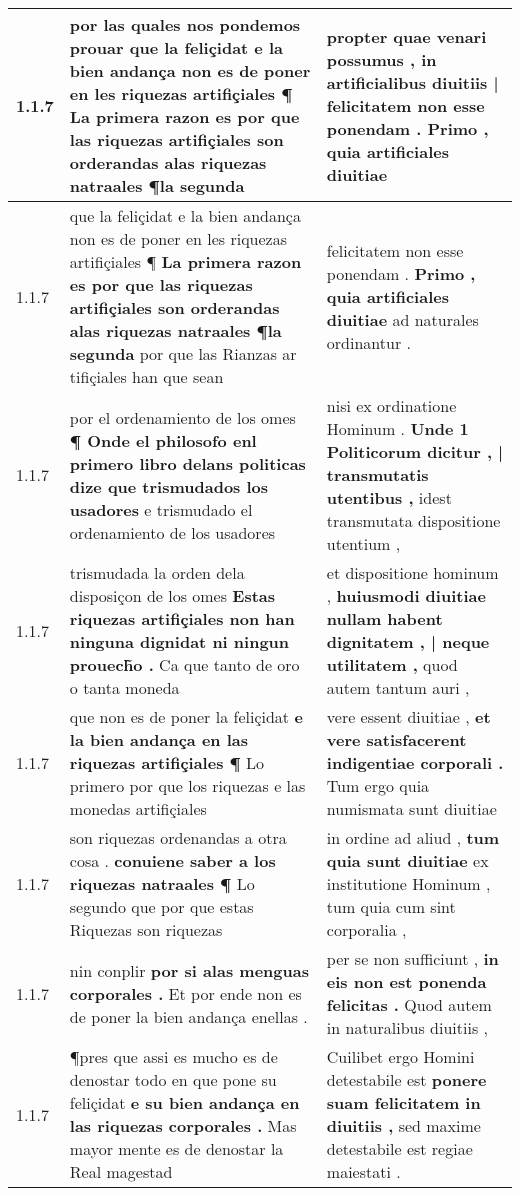 \begin{tabular}{|p{1cm}|p{6.5cm}|p{6.5cm}|}
1.1.7 & por las quales nos pondemos prouar \textbf{ que la feliçidat e la bien andança non es de poner en les riquezas artifiçiales ¶ } La primera razon es por que las riquezas artifiçiales son orderandas alas riquezas natraales ¶la segunda & propter quae venari possumus , \textbf{ in artificialibus diuitiis | felicitatem non esse ponendam . } Primo , quia artificiales diuitiae \\\hline
1.1.7 & que la feliçidat e la bien andança non es de poner en les riquezas artifiçiales ¶ \textbf{ La primera razon es por que las riquezas artifiçiales son orderandas alas riquezas natraales ¶la segunda } por que las Rianzas ar tifiçiales han que sean & felicitatem non esse ponendam . \textbf{ Primo , quia artificiales diuitiae } ad naturales ordinantur . \\\hline
1.1.7 & por el ordenamiento de los omes \textbf{ ¶ Onde el philosofo enl primero libro delans politicas dize que trismudados los usadores } e trismudado el ordenamiento de los usadores & nisi ex ordinatione Hominum . \textbf{ Unde 1 Politicorum dicitur , | transmutatis utentibus , } idest transmutata dispositione utentium , \\\hline
1.1.7 & trismudada la orden dela disposiçon de los omes \textbf{ Estas riquezas artifiçiales non han ninguna dignidat ni ningun prouech̃o . } Ca que tanto de oro o tanta moneda & et dispositione hominum , \textbf{ huiusmodi diuitiae nullam habent dignitatem , | neque utilitatem , } quod autem tantum auri , \\\hline
1.1.7 & que non es de poner la feliçidat \textbf{ e la bien andança en las riquezas artifiçiales ¶ } Lo primero por que los riquezas e las monedas artifiçiales & vere essent diuitiae , \textbf{ et vere satisfacerent indigentiae corporali . } Tum ergo quia numismata sunt diuitiae \\\hline
1.1.7 & son riquezas ordenandas a otra cosa . \textbf{ conuiene saber a los riquezas natraales ¶ } Lo segundo que por que estas Riquezas son riquezas & in ordine ad aliud , \textbf{ tum quia sunt diuitiae } ex institutione Hominum , tum quia cum sint corporalia , \\\hline
1.1.7 & nin conplir \textbf{ por si alas menguas corporales . } Et por ende non es de poner la bien andança enellas . & per se non sufficiunt , \textbf{ in eis non est ponenda felicitas . } Quod autem in naturalibus diuitiis , \\\hline
1.1.7 & ¶pres que assi es mucho es de denostar todo en que pone su feliçidat \textbf{ e su bien andança en las riquezas corporales . } Mas mayor mente es de denostar la Real magestad & Cuilibet ergo Homini detestabile est \textbf{ ponere suam felicitatem in diuitiis , } sed maxime detestabile est regiae maiestati . \\\hline

\end{tabular}
